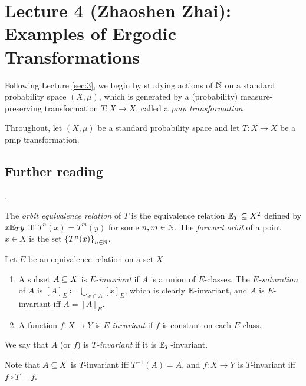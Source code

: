 \documentclass[reqno, twoside]{article}
\begin{document}
    \section{Lecture 4 (Zhaoshen Zhai): Examples of Ergodic Transformations}\label{sec:4}

    Following Lecture \ref{sec:3}, we begin by studying actions of $\mathbb{N}$ on a standard probability space $(X,\mu)$, which is generated by a (probability) measure-preserving transformation $T:X\to X$, called a \textit{pmp transformation}.

    Throughout, let $(X,\mu)$ be a standard probability space and let $T:X\to X$ be a pmp transformation.

    {\vspace{-0.1in}\small\subsection*{Further reading}\cite[Lectures 1 to 4]{Tse22}.}

    \begin{definition}
        The \textit{orbit equivalence relation} of $T$ is the equivalence relation $\mathbb{E}_T\subseteq X^2$ defined by $x\mathbb{E}_Ty$ iff $T^n(x)=T^m(y)$ for some $n,m\in\mathbb{N}$. The \textit{forward orbit} of a point $x\in X$ is the set $\left\{T^n(x)\right\}_{n\in\mathbb{N}}$.
    \end{definition}

    \begin{definition}
        Let $E$ be an equivalence relation on a set $X$.
        \begin{enumerate}
            \item A subset $A\subseteq X$ is \textit{$E$-invariant} if $A$ is a union of $E$-classes. The \textit{$E$-saturation} of $A$ is $[A]_E\coloneqq\bigcup_{x\in A}[x]_E$, which is clearly $\mathbb{E}$-invariant, and $A$ is $E$-invariant iff $A=[A]_E$.
                \vspace{-0.05in}
            \item A function $f:X\to Y$ is \textit{$E$-invariant} if $f$ is constant on each $E$-class.
        \end{enumerate}
        We say that $A$ (or $f$) is \textit{$T$-invariant} if it is $\mathbb{E}_T$-invariant.
    \end{definition}

    \begin{remark}
        Note that $A\subseteq X$ is $T$-invariant iff $T^{-1}(A)=A$, and $f:X\to Y$ is $T$-invariant iff $f\circ T=f$.
    \end{remark}
\end{document}
